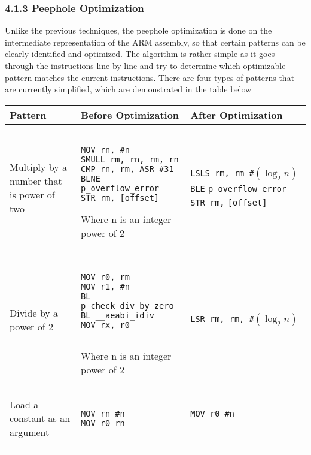 \documentclass[10pt,a4paper]{report}
\newenvironment{tabularverbatim}
 {\VerbatimEnvironment
  \begin{BVerbatim}[baseline=c,formatcom=\setlength{\baselineskip}{\normalbaselineskip}]}
 {\end{BVerbatim}}
\begin{document}
  \subsubsection*{4.1.3 Peephole Optimization}
  Unlike the previous techniques, the peephole optimization is done on the
  intermediate representation of the ARM assembly, so that certain patterns can
  be clearly identified and optimized. The algorithm is rather simple as it goes
  through the instructions line by line and try to determine which optimizable
  pattern matches the current instructions. There are four types of patterns
  that are currently simplified, which are demonstrated in the table below

  \begin{center}
    \begin{tabular}{| m{3cm} | m{4cm} | m{4cm} |}
      \hline
      Pattern & Before Optimization & After Optimization \\
      \hline
      Multiply by a number that is power of two &
      \begin{tabularverbatim}

MOV rn, #n
SMULL rm, rn, rm, rn
CMP rn, rm, ASR #31
BLNE p_overflow_error
STR rm, [offset]

      \end{tabularverbatim}
      \newline
      Where n is an integer power of 2
      &
      \texttt{LSLS rm, rm \#$(\log_2 n)$}
      \newline
      \texttt{BLE} \verb|p_overflow_error|
      \newline
      \texttt{STR rm,} \verb|[offset]|
      \\
      \hline
      Divide by a power of 2 &
      \begin{tabularverbatim}

MOV r0, rm
MOV r1, #n
BL p_check_div_by_zero
BL __aeabi_idiv
MOV rx, r0
 
      \end{tabularverbatim}
      \newline
      Where n is an integer power of 2
      &
      \texttt{LSR rm, rm, \#$(\log_2 n)$}
      \\
      \hline
      Load a constant as an argument &
      \begin{tabularverbatim}

MOV rn #n
MOV r0 rn
 
      \end{tabularverbatim}
      &
      \begin{tabularverbatim}
MOV r0 #n


\end{tabularverbatim}
\end{tabular}
\end{center}
\end{document}
